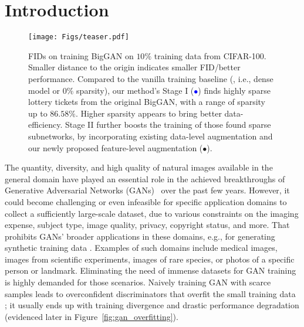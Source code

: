 \documentclass{article}
\begin{document}
\section{Introduction}
\vspace{-1em}
\begin{wrapfigure}{r}{0.45\linewidth}
\centering
\vspace{-1.0em}
\texttt{[image: Figs/teaser.pdf]}
\vspace{-1.8em}
\caption{\small{FIDs on training BigGAN on $10\%$ training data from CIFAR-100. Smaller distance to the origin indicates smaller FID/better performance. Compared to the vanilla training baseline (\textcolor{red}{}, i.e., dense model or $0\%$ sparsity), our method's Stage I (\textcolor{blue}{$\bullet$}) finds highly sparse lottery tickets from the original BigGAN, with a range of sparsity up to $86.58\%$. Higher sparsity appears to bring better data-efficiency. Stage II further boosts the training of those found sparse subnetworks, by incorporating existing data-level augmentation \cite{zhao2020diffaugment} and our newly proposed feature-level augmentation (\textcolor{OliveGreen}{$\bullet$}).}}
\vspace{-1.5em}
\label{fig:teaser}
\end{wrapfigure}

The quantity, diversity, and high quality of natural images available in the general domain have played an essential role in the achieved breakthroughs of Generative Adversarial Networks (GANs)~\cite{brock2018large,goodfellow2014generative,karras2017progressive,karras2019style,karras2020analyzing,Miyato:2018wa,MiyatoK18,kupyn2019deblurgan,gong2019autogan,jiang2021enlightengan} over the past few years.
However, it could become challenging or even infeasible for specific application domains to collect a sufficiently large-scale dataset, due to various constraints on the imaging expense, subject type, image quality, privacy, copyright status, and more. That prohibits GANs' broader applications in these domains, e.g., for generating synthetic training data \cite{shrivastava2017learning}. Examples of such domains include medical images, images from scientific experiments,  images of rare species, or photos of a specific person or landmark. Eliminating the need of immense datasets for GAN training is highly demanded for those scenarios. Naively training GAN with scarce samples leads to overconfident discriminators that overfit the small training data \cite{arjovsky2017towards,zhang2018pa,karras2020training,zhao2020diffaugment}; it usually ends up with training divergence and drastic performance degradation (evidenced later in Figure~\ref{fig:gan_overfitting}). 
\end{document}
